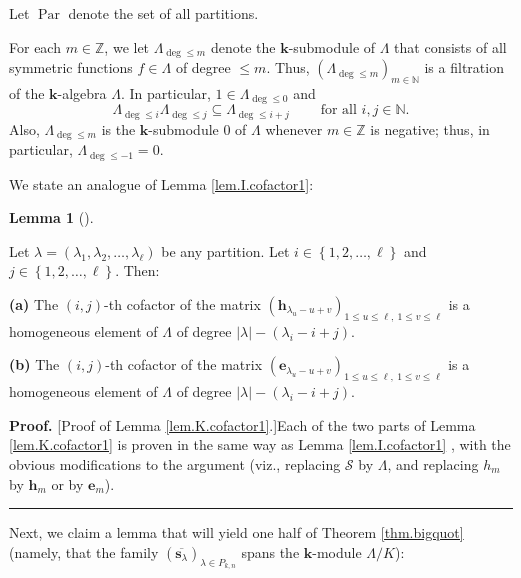 \documentclass[numbers=enddot,12pt,final,onecolumn,notitlepage]{scrartcl}%
\theoremstyle{definition}
\newtheorem{lem}[theo]{Lemma}
\newenvironment{lemma}[1][]
{\begin{lem}[#1]\begin{leftbar}}
{\end{leftbar}\end{lem}}
\newenvironment{proof}[1][Proof]{\noindent\textbf{#1.} }{\ \rule{0.5em}{0.5em}}
\begin{document}
Let $\operatorname*{Par}$ denote the set of all partitions.

For each $m\in\mathbb{Z}$, we let $\Lambda_{\deg\leq m}$ denote the
$\mathbf{k}$-submodule of $\Lambda$ that consists of all symmetric functions
$f\in\Lambda$ of degree $\leq m$. Thus, $\left(  \Lambda_{\deg\leq m}\right)
_{m\in\mathbb{N}}$ is a filtration of the $\mathbf{k}$-algebra $\Lambda$. In
particular, $1\in\Lambda_{\deg\leq0}$ and
\begin{equation}
\Lambda_{\deg\leq i}\Lambda_{\deg\leq j}\subseteq\Lambda_{\deg\leq
i+j}\ \ \ \ \ \ \ \ \ \ \text{for all }i,j\in\mathbb{N}.
\label{eq.thm.bigquot.Lamfil}%
\end{equation}
Also, $\Lambda_{\deg\leq m}$ is the $\mathbf{k}$-submodule $0$ of $\Lambda$
whenever $m\in\mathbb{Z}$ is negative; thus, in particular, $\Lambda_{\deg
\leq-1}=0$.

We state an analogue of Lemma \ref{lem.I.cofactor1}:

\begin{lemma}
\label{lem.K.cofactor1}Let $\lambda=\left(  \lambda_{1},\lambda_{2}%
,\ldots,\lambda_{\ell}\right)  $ be any partition. Let $i\in\left\{
1,2,\ldots,\ell\right\}  $ and $j\in\left\{  1,2,\ldots,\ell\right\}  $. Then:

\textbf{(a)} The $\left(  i,j\right)  $-th cofactor of the matrix $\left(
\mathbf{h}_{\lambda_{u}-u+v}\right)  _{1\leq u\leq\ell,\ 1\leq v\leq\ell}$ is
a homogeneous element of $\Lambda$ of degree $\left\vert \lambda\right\vert
-\left(  \lambda_{i}-i+j\right)  $.

\textbf{(b)} The $\left(  i,j\right)  $-th cofactor of the matrix $\left(
\mathbf{e}_{\lambda_{u}-u+v}\right)  _{1\leq u\leq\ell,\ 1\leq v\leq\ell}$ is
a homogeneous element of $\Lambda$ of degree $\left\vert \lambda\right\vert
-\left(  \lambda_{i}-i+j\right)  $.
\end{lemma}

\begin{proof}
[Proof of Lemma \ref{lem.K.cofactor1}.]Each of the two parts of Lemma
\ref{lem.K.cofactor1} is proven in the same way as Lemma \ref{lem.I.cofactor1}%
, with the obvious modifications to the argument (viz., replacing
$\mathcal{S}$ by $\Lambda$, and replacing $h_{m}$ by $\mathbf{h}_{m}$ or by
$\mathbf{e}_{m}$).
\end{proof}

Next, we claim a lemma that will yield one half of Theorem \ref{thm.bigquot}
(namely, that the family $\left(  \overline{\mathbf{s}_{\lambda}}\right)
_{\lambda\in P_{k,n}}$ spans the $\mathbf{k}$-module $\Lambda/K$):
\end{document}
